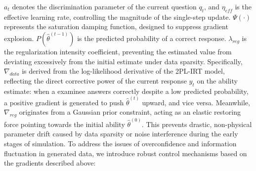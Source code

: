 $a_t$ denotes the discrimination parameter of the current question $q_t$, and $\eta_{eff}$ is the effective learning rate, controlling the magnitude of the single-step update. $\Psi(\cdot)$ represents the saturation damping function, designed to suppress gradient explosion. $P(\hat{\theta}^{(t-1)})$ is the predicted probability of a correct response. $\lambda_{reg}$ is the regularization intensity coefficient, preventing the estimated value from deviating excessively from the initial estimate under data sparsity. Specifically, $\nabla_{data}$ is derived from the log-likelihood derivative of the 2PL-IRT model, reflecting the direct corrective power of the current response $y_t$ on the ability estimate: when a examinee answers correctly despite a low predicted probability, a positive gradient is generated to push $\hat{\theta}^{(t)}$ upward, and vice versa. Meanwhile, $\nabla_{reg}$ originates from a Gaussian prior constraint, acting as an elastic restoring force pointing towards the initial ability $\hat{\theta}^{(0)}$. This prevents drastic, non-physical parameter drift caused by data sparsity or noise interference during the early stages of simulation. To address the issues of overconfidence and information fluctuation in generated data\cite{yao2024adard}, we introduce robust control mechanisms based on the gradients described above:

